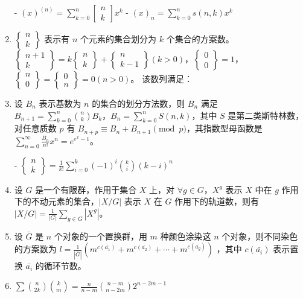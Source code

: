 \begin{enumerate}
- $(x)^{(n)}=\sum_{k=0}^{n}\begin{bmatrix}n\\k\end{bmatrix}x^{k}$
- $(x)_{n}=\sum_{k=0}^{n}s(n,k)x^{k}$

\item $\begin{Bmatrix}n\\k\end{Bmatrix}$ 表示有 $n$ 个元素的集合划分为 $k$ 个集合的方案数。$\begin{Bmatrix}n+1\\k\end{Bmatrix}=k\begin{Bmatrix}n\\k\end{Bmatrix}+\begin{Bmatrix}n\\k-1\end{Bmatrix}(k>0)$，$\begin{Bmatrix}0\\0\end{Bmatrix}=1$，$\begin{Bmatrix}n\\0\end{Bmatrix}=\begin{Bmatrix}0\\n\end{Bmatrix}=0(n>0)$。
该数列满足：

\item 设 $B_{n}$ 表示基数为 $n$ 的集合的划分方法数，则 $B_{n}$ 满足 $B_{n+1}=\sum_{k=0}^{n}{n\choose k}B_{k}$，$B_{n}=\sum_{k=0}^{n}S(n, k)$，其中 $S$ 是第二类斯特林数，对任意质数 $p$ 有 $B_{n+p}\equiv B_{n}+B_{n+1}\pmod{p}$，其指数型母函数是 $\sum_{n=0}^{\infty}\frac{B_{n}}{n!}x^{n}=e^{e^{x}-1}$。

- $\begin{Bmatrix}n\\k\end{Bmatrix}=\frac{1}{k!}\sum_{i=0}^{k}(-1)^{i}{k\choose i}(k-i)^{n}$

\item 设 $G$ 是一个有限群，作用于集合 $X$ 上，对 $\forall g\in G$，$X^{g}$ 表示 $X$ 中在 $g$ 作用下的不动元素的集合，$|X/G|$ 表示 $X$ 在 $G$ 作用下的轨道数，则有 $|X/G|=\frac{1}{|G|}\sum_{g\in G}|X^{g}|$。

\item 设 $\bar{G}$ 是 $n$ 个对象的一个置换群，用 $m$ 种颜色涂染这 $n$ 个对象，则不同染色的方案数为 $l=\frac{1}{|\bar{G}|}(m^{c(\bar{a_{1}})}+m^{c(\bar{a_{2}})}+\cdots+m^{c(\bar{a_{g}})})$ ，其中 $c(\bar{a_{i}})$ 表示置换 $\bar{a_{i}}$ 的循环节数。

\item $\sum{n\choose2k}{k\choose m}=\frac{n}{n-m}{n-m\choose n-2m}2^{n-2m-1}$

\end{enumerate}

